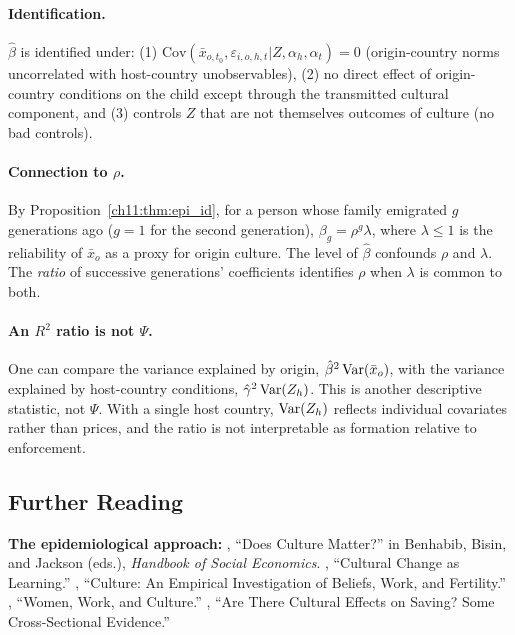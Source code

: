 \documentclass[../structural_economics_book.tex]{subfiles}
\begin{document}
\paragraph{Identification.} $\hat{\beta}$ is identified under: (1) $\text{Cov}(\bar{x}_{o,t_0}, \varepsilon_{i,o,h,t} | Z, \alpha_h, \alpha_t) = 0$ (origin-country norms uncorrelated with host-country unobservables), (2) no direct effect of origin-country conditions on the child except through the transmitted cultural component, and (3) controls $Z$ that are not themselves outcomes of culture (no bad controls).

\paragraph{Connection to $\rho$.} By Proposition~\ref{ch11:thm:epi_id}, for a person whose family emigrated $g$ generations ago ($g = 1$ for the second generation), $\beta_g = \rho^{g}\lambda$, where $\lambda \le 1$ is the reliability of $\bar{x}_o$ as a proxy for origin culture. The level of $\hat{\beta}$ confounds $\rho$ and $\lambda$. The \textit{ratio} of successive generations' coefficients identifies $\rho$ when $\lambda$ is common to both.

\paragraph{An $R^2$ ratio is not $\Psi$.} One can compare the variance explained by origin, $\hat{\beta}^2\operatorname{Var}(\bar{x}_o)$, with the variance explained by host-country conditions, $\hat{\gamma}^2\operatorname{Var}(Z_h)$. This is another descriptive statistic, not $\Psi$. With a single host country, $\operatorname{Var}(Z_h)$ reflects individual covariates rather than prices, and the ratio is not interpretable as formation relative to enforcement.


\subsection*{Further Reading}

\textbf{The epidemiological approach:} \citet{fernandez2011does}, ``Does Culture Matter?'' in Benhabib, Bisin, and Jackson (eds.), \textit{Handbook of Social Economics}. \citet{fernandez2013cultural}, ``Cultural Change as Learning.'' \citet{fernandez2009culture}, ``Culture: An Empirical Investigation of Beliefs, Work, and Fertility.'' \citet{fernandez2007women}, ``Women, Work, and Culture.'' \citet{carroll1994there}, ``Are There Cultural Effects on Saving? Some Cross-Sectional Evidence.''
\end{document}
